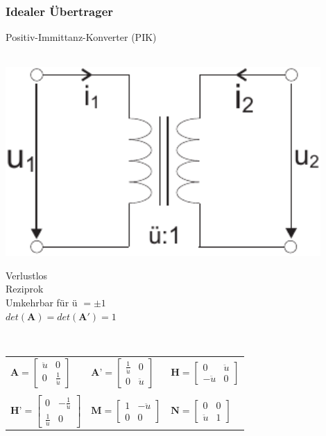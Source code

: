 \documentclass[a4paper,twocolumn,10pt]{article}
\begin{document}
\subsubsection*{Idealer Übertrager}
Positiv-Immittanz-Konverter (PIK)\\\\
\begin{minipage}[b]{0.2\textwidth}
\includegraphics[width=0.9\textwidth]{Grafiken/OP_Uebertrager}
\end{minipage}
\hfill
\begin{minipage}[b]{0.26\textwidth}
Verlustlos\\
Reziprok\\
Umkehrbar für ü $=\pm 1$\\
$det(\textbf{A})=det(\textbf{A}')=1$\\
\end{minipage}\\

\begin{tabular}{lll}
$\textbf{A}=\begin{bmatrix}\ddot{u} & 0\\ 0 & \frac{1}{\ddot{u}}\end{bmatrix}$ & $\textbf{A'}=\begin{bmatrix}\frac{1}{\ddot{u}} & 0\\ 0 & \ddot{u}\end{bmatrix}$ & $\textbf{H}=\begin{bmatrix}0 & \ddot{u}\\ -\ddot{u} & 0\end{bmatrix}$\\\\
$\textbf{H'}=\begin{bmatrix}0 & -\frac{1}{\ddot{u}}\\ \frac{1}{\ddot{u}} & 0\end{bmatrix}$ & $\textbf{M}=\begin{bmatrix}1 & -\ddot{u}\\ 0 & 0\end{bmatrix}$ & $\textbf{N}=\begin{bmatrix}0 & 0\\ \ddot{u} & 1\end{bmatrix}$
\end{tabular}
\end{document}
